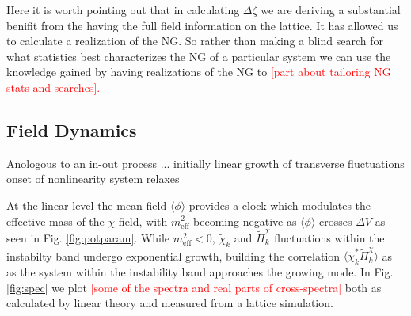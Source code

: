 Here it is worth pointing out that in calculating $\Delta\zeta$ we are deriving a substantial benifit from the having the full field information on the lattice. It has allowed us to calculate a realization of the NG. So rather than making a blind search for what statistics best characterizes the NG of a particular system we can use the knowledge gained by having realizations of the NG to \textcolor{red}{[part about tailoring NG stats and searches].}



\Fzetaslice


\subsection{Field Dynamics} \label{sec:field dynamics}
Anologous to an in-out process ...
initially linear growth of transverse fluctuations
onset of nonlinearity
system relaxes

At the linear level the mean field $\langle\phi\rangle$ provides a clock which modulates the effective mass of the $\chi$ field, with $m^2_\mathrm{eff}$ becoming negative as $\langle\phi\rangle$ crosses $\Delta V$ as seen in Fig. \ref{fig:potparam}. While $m^2_\mathrm{eff}<0$, $\tilde{\chi}_k$ and $\tilde{\Pi}^\chi_k$ fluctuations within the instabilty band undergo exponential growth, building the correlation $\langle\tilde{\chi}^*_k\tilde{\Pi}^\chi_k\rangle$ as as the system within the instability band approaches the growing mode. In Fig. \ref{fig:spec} we plot \textcolor{red}{[some of the spectra and real parts of cross-spectra]} both as calculated by linear theory and measured from a lattice simulation.

\Fspec


